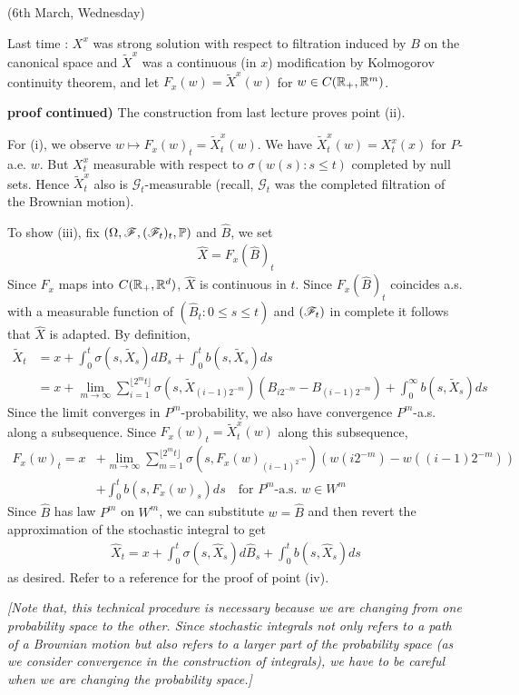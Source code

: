 \documentclass[12pt,a4paper]{article}
\newenvironment{proof}
{\begin{changemargin}{0.5cm}{0.5cm} 
	}%
	{\end{changemargin}
}
\newenvironment{p}
{\begin{proof} 
	}%
	{\end{proof}
}
\begin{document}
\newday

(6th March, Wednesday)
\s

Last time : $X^x$ was strong solution with respect to filtration induced by $B$ on the canonical space and $\tilde{X}^x$ was a continuous (in $x$) modification by Kolmogorov continuity theorem, and let $F_x(w) = \tilde{X}^x(w)$ for $w\in C(\mathbb{R}_+, \mathbb{R}^m)$.
\s

\begin{p}
\textbf{proof continued)} The construction from last lecture proves point (ii). 

\quad For (i), we observe $w\mapsto F_x(w)_t =\tilde{X}_t^x(w)$. We have $\tilde{X}^x_t(w) = X_t^x(x)$ for $P$-a.e. $w$. But $X_t^x$ measurable with respect to $\sigma(w(s) : s\leq t)$ completed by null sets. Hence $\tilde{X}_t^x$ also is $\mathscr{G}_t$-measurable (recall, $\mathscr{G}_t$ was the completed filtration of the Brownian motion).

\quad To show (iii), fix $(\Omega, \mathscr{F}, (\mathscr{F}_t)_t, \mathbb{P})$ and $\hat{B}$, we set
\begin{align*}
\hat{X} = F_x (\hat{B})_t
\end{align*}
Since $F_x$ maps into $C(\mathbb{R}_+, \mathbb{R}^d)$, $\hat{X}$ is continuous in $t$. Since ${F}_x(\hat{B})_t$ coincides a.s. with a measurable function of $(\hat{B}_t:0\leq s\leq t)$ and $(\mathscr{F}_t)$ in complete it follows that $\hat{X}$ is adapted. By definition, 
\begin{align*}
\tilde{X}_t &= x + \int_0^t \sigma(s, \tilde{X}_s) dB_s + \int_0^t b(s, \tilde{X}_s) ds \\
&= x+ \lim_{m\rightarrow \infty} \sum_{i=1}^{\lfloor 2^m t\rfloor} \sigma(s, \tilde{X}_{(i-1)2^{-m}})(B_{i2^{-m}} - B_{(i-1)2^{-m}}) +\int_0^{\infty} b(s, \tilde{X}_s) ds
\end{align*}
Since the limit converges in $P^m$-probability, we also have convergence $P^m$-a.s. along a subsequence. Since $F_x(w)_t = \tilde{X}_t^x (w)$ along this subsequence,
\begin{align*}
F_x(w)_t = x &+ \lim_{m\rightarrow \infty} \sum_{m=1}^{\lfloor 2^m t\rfloor} \sigma(s, F_x(w)_{(i-1)^{2^{-m}}})(w(i2^{-m}) - w((i-1)2^{-m})) \\
& + \int_0^t b(s, F_x(w)_s) ds \quad \text{for } P^m\text{-a.s. }w\in W^m
\end{align*}
Since $\hat{B}$ has law $P^m$ on $W^m$, we can substitute $w= \hat{B}$ and then revert the approximation of the stochastic integral to get
\begin{align*}
\hat{X}_t =x + \int_0^t \sigma(s, \hat{X}_s) d\hat{B}_s + \int_0^t b(s, \hat{X}_s) ds
\end{align*}
as desired.
\quad Refer to a reference for the proof of point (iv).

\eop

\emph{[Note that, this technical procedure is necessary because we are changing from one probability space to the other. Since stochastic integrals not only refers to a path of a Brownian motion but also refers to a larger part of the probability space (as we consider convergence in the construction of integrals), we have to be careful when we are changing the probability space.]}
\end{p}
\s
\end{document}
